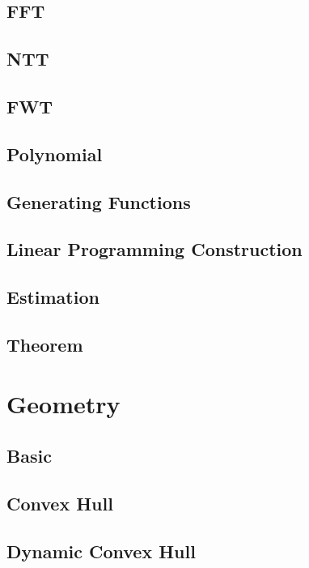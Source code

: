 \subsection{FFT}

\subsection{NTT}

\subsection{FWT}

\subsection{Polynomial}

\subsection{Generating Functions}

\subsection{Linear Programming Construction}

\subsection{Estimation}

\subsection{Theorem}


\section{Geometry}
\subsection{Basic}

\subsection{Convex Hull}

\subsection{Dynamic Convex Hull}

